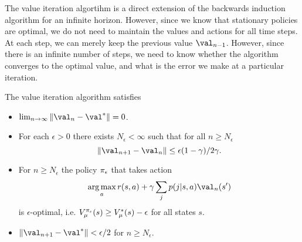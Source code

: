   The value iteration algortihm is a direct extension of the backwards induction algorithm for an infinite horizon. However, since we know that stationary policies are optimal, we do not need to maintain the values and actions for all time steps. At each step, we can merely keep the previous value $\val_{n-1}$. However, since there is an infinite number of steps, we need to know whether the algorithm converges to the optimal value, and what is the error we make at a particular iteration.
  \begin{theorem}
    The value iteration algorithm satisfies
    \begin{itemize}
    \item $\lim_{n \to \infty} \|\val_n - \val^*\| = 0$. 
    \item For each $\epsilon>0$ there exists $N_\epsilon <\infty$ such that for all $n\geq N_\epsilon$
      \begin{equation}
        \|\val_{n+1} - \val_n\| \leq \epsilon(1 - \disc)/2\disc.
        \label{eq:value-iteration-stopping}
      \end{equation}
    \item For $n\geq N_\epsilon$ the policy $\pi_\epsilon$ that takes action
      \[
      \argmax_a r(s,a) + \disc \sum_j p(j|s,a)\val_n(s')
      \]
      is
      $\epsilon$-optimal, i.e. $V^{\pi_\epsilon}_\mu(s) \geq V^*_\mu(s) - \epsilon$ for all states $s$.
    \item $\|\val_{n+1} - \val^*\| < \epsilon/2$ for $n \geq N_\epsilon$.
    \end{itemize}
  \end{theorem}
